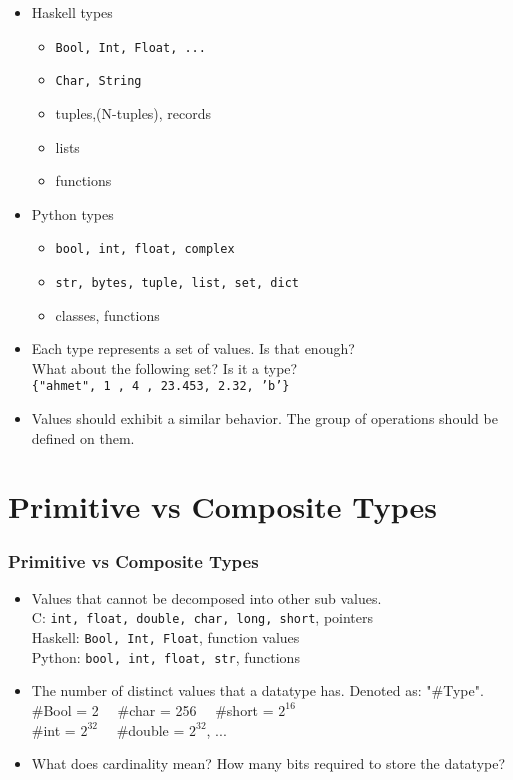 \begin{frame}
\begin{itemize}
\item Haskell types
\begin{itemize}
\item \texttt{Bool, Int, Float, ...}
\item \texttt{Char, String}
\item tuples,(N-tuples), records
\item lists
\item functions
\end{itemize}
\item Python types
\begin{itemize}
\item \texttt{bool, int, float, complex}
\item \texttt{str, bytes, tuple, list, set, dict}
\item classes, functions
\end{itemize}
\item Each type represents a set of values.
Is that enough?\\
\pause
What about the following set? Is it a type?\\
\texttt{\{"ahmet", 1 , 4 , 23.453, 2.32, 'b'\}} \pause
\item Values should exhibit a similar behavior. The  group of operations
should be defined on them.
\end{itemize}
\end{frame}

\section{Primitive vs Composite Types}
\begin{frame}
 \frametitle{Primitive vs Composite Types}
\begin{itemize}
\item {} Values that cannot be decomposed into other sub values.\\
	C: \texttt{int, float, double, char, long, short}, pointers\\
	Haskell: \texttt{Bool, Int, Float}, function values\\
	Python: \texttt{bool, int, float, str}, functions
\item {} 
The number of distinct values that a datatype has.
Denoted as: "\#Type".\\
\#Bool = 2 \ \ \#char = 256 \ \ \#short = $2^{16}$ \\
\#int = $2^{32}$ \ \ \#double = $2^{32}$, ...
\item What does cardinality mean?
\pause
How many bits required to store the datatype? 
\end{itemize}
\end{frame}


